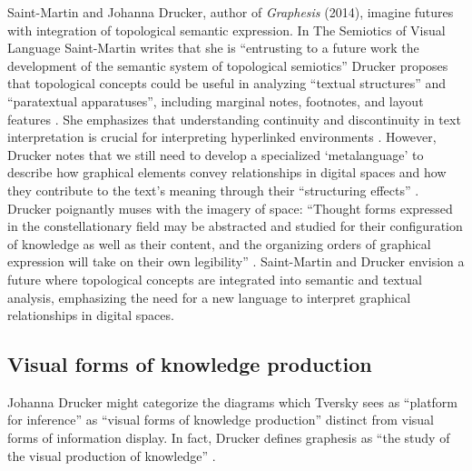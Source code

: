 Saint-Martin and Johanna Drucker, author of \textit{Graphesis} (2014), imagine futures with integration of topological semantic expression. In The Semiotics of Visual Language Saint-Martin writes that she is ``entrusting to a future work the development of the semantic system of topological semiotics” \citep[p. 225]{saint-martin_semiotics_1990}  Drucker proposes that topological concepts could be useful in analyzing “textual structures” and ``paratextual apparatuses”, including marginal notes, footnotes, and layout features \citep[p. 54]{drucker_graphesis_2014}. She emphasizes that understanding continuity and discontinuity in text interpretation is crucial for interpreting hyperlinked environments \citep[p. 54]{drucker_graphesis_2014}. However, Drucker notes that we still need to develop a specialized `metalanguage’ to describe how graphical elements convey relationships in digital spaces and how they contribute to the text's meaning through their ``structuring effects” \citep[p. 54]{drucker_graphesis_2014}. Drucker poignantly muses with the imagery of space: ``Thought forms expressed in the constellationary field may be abstracted and studied for their configuration of knowledge as well as their content, and the organizing orders of graphical expression will take on their own legibility” \citep[p. 196]{drucker_graphesis_2014}. Saint-Martin and Drucker envision a future where topological concepts are integrated into semantic and textual analysis, emphasizing the need for a new language to interpret graphical relationships in digital spaces.
\subsection{Visual forms of knowledge production}
Johanna Drucker might categorize the diagrams which Tversky sees as ``platform for inference” as ``visual forms of knowledge production” \citep{drucker_graphesis_2014} distinct from visual forms of information display. In fact, Drucker defines graphesis as ``the study of the visual production of knowledge” \citep[p. 3]{drucker_graphesis_2014}.

